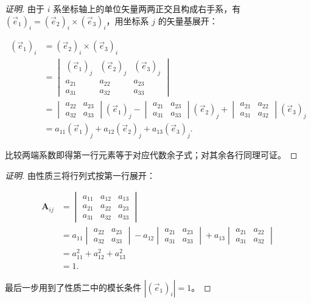 \begin{proof}[证明]
由于 $i$ 系坐标轴上的单位矢量两两正交且构成右手系，有 $(\vec{e}_1)_i=(\vec{e}_2)_i\times(\vec{e}_3)_i$，用坐标系 $j$ 的矢量基展开：

\[
\begin{aligned}
(\vec{e}_1)_i&=(\vec{e}_2)_i\times(\vec{e}_3)_i\\
&=\begin{vmatrix}(\vec{e}_1)_j&(\vec{e}_2)_j&(\vec{e}_3)_j\\a_{21}&a_{22}&a_{23}\\a_{31}&a_{32}&a_{33}\end{vmatrix}\\
&=\begin{vmatrix}a_{22}&a_{23}\\a_{32}&a_{33}\end{vmatrix}(\vec{e}_1)_j-\begin{vmatrix}a_{21}&a_{23}\\a_{31}&a_{33}\end{vmatrix}(\vec{e}_2)_j+\begin{vmatrix}a_{21}&a_{22}\\a_{31}&a_{32}\end{vmatrix}(\vec{e}_3)_j\\
&=a_{11}(\vec{e}_1)_j+a_{12}(\vec{e}_2)_j+a_{13}(\vec{e}_3)_j.
\end{aligned}
\]

比较两端系数即得第一行元素等于对应代数余子式；对其余各行同理可证。
\end{proof}
\begin{theorem}
\begin{proof}[证明]
由性质三将行列式按第一行展开：

\[
\begin{aligned}
\boldsymbol{A}_{ij}&=\begin{vmatrix}a_{11}&a_{12}&a_{13}\\a_{21}&a_{22}&a_{23}\\a_{31}&a_{32}&a_{33}\end{vmatrix}\\
&=a_{11}\begin{vmatrix}a_{22}&a_{23}\\a_{32}&a_{33}\end{vmatrix}-a_{12}\begin{vmatrix}a_{21}&a_{23}\\a_{31}&a_{33}\end{vmatrix}+a_{13}\begin{vmatrix}a_{21}&a_{22}\\a_{31}&a_{32}\end{vmatrix}\\
&=a_{11}^2+a_{12}^2+a_{13}^2\\
&=1.
\end{aligned}
\]

最后一步用到了性质二中的模长条件 $|(\vec{e}_1)_i|=1$。
\end{proof}
\end{theorem}
